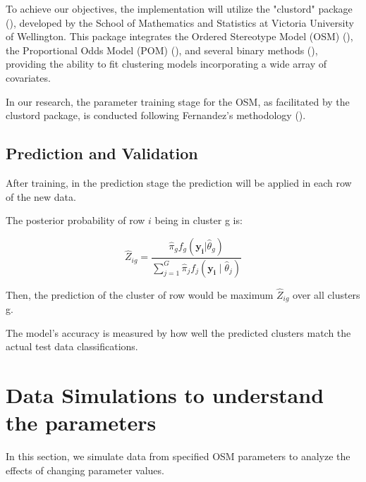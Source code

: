 \documentclass{article}
\begin{document}
To achieve our objectives, the implementation will utilize the "clustord" package (\cite{clustord2024}), 
developed by the School of Mathematics and Statistics at Victoria University of Wellington. 
This package integrates the Ordered Stereotype Model (OSM) (\cite{fernandez2016mixture}), the Proportional Odds Model (POM) (\cite{matechou2016biclustering}), and several binary methods (\cite{pledger2014multivariate}), 
providing the ability to fit clustering models incorporating a wide array of covariates.

In our research, the parameter training stage for the OSM, as facilitated by the clustord package, is conducted following Fernandez's methodology (\cite{fernandez2016mixture}).

\subsection{Prediction and Validation}

After training, in the prediction stage the prediction will be applied in each row of the new data.

The posterior probability of row $i$ being in cluster g is:


\begin{equation}
  \hat{Z}_{ig} = \frac{\hat{\pi}_g f_g(\mathbf{y_i}|\hat{\theta}_g)}{\sum_{j=1}^{G} \hat{\pi}_j f_j(\mathbf{y_i} \mid \hat{\theta}_j)}
\end{equation}

Then, the prediction of the cluster of row would be maximum $\hat{Z}_{ig}$ over all clusters g.

The model's accuracy is measured by how well the predicted clusters match the actual test data classifications.

\section{Data Simulations to understand the parameters}

In this section, we simulate data from specified OSM parameters to analyze the effects of changing parameter values.
\end{document}
